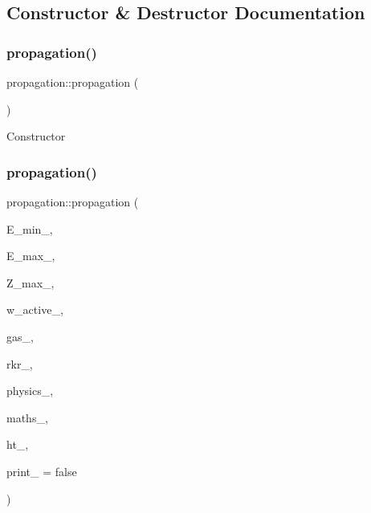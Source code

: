 \subsection{Constructor \& Destructor Documentation}
\mbox{\label{classpropagation_a9d7b9f42ce1c0bc741d3016a07ba13f7}} 
\subsubsection{\texorpdfstring{propagation()}{propagation()}\hspace{0.1cm}{\footnotesize\ttfamily [1/2]}}
{\footnotesize\ttfamily propagation\+::propagation (\begin{DoxyParamCaption}{ }\end{DoxyParamCaption})}

Constructor \mbox{\label{classpropagation_a83d9af4c672b33155f87756647cd9ada}} 
\subsubsection{\texorpdfstring{propagation()}{propagation()}\hspace{0.1cm}{\footnotesize\ttfamily [2/2]}}
{\footnotesize\ttfamily propagation\+::propagation (\begin{DoxyParamCaption}\item[{double}]{E\+\_\+min\+\_\+,  }\item[{double}]{E\+\_\+max\+\_\+,  }\item[{double}]{Z\+\_\+max\+\_\+,  }\item[{Eigen\+::\+Array\+Xd}]{w\+\_\+active\+\_\+,  }\item[{\mbox{\hyperlink{classkeldysh__gas}{keldysh\+\_\+gas}} \&}]{gas\+\_\+,  }\item[{\mbox{\hyperlink{classgrid__rkr}{grid\+\_\+rkr}} \&}]{rkr\+\_\+,  }\item[{\mbox{\hyperlink{classphysics__textbook}{physics\+\_\+textbook}} \&}]{physics\+\_\+,  }\item[{\mbox{\hyperlink{classmaths__textbook}{maths\+\_\+textbook}} \&}]{maths\+\_\+,  }\item[{\mbox{\hyperlink{class_d_h_t}{D\+HT}} \&}]{ht\+\_\+,  }\item[{bool}]{print\+\_\+ = {\ttfamily false} }\end{DoxyParamCaption})}



